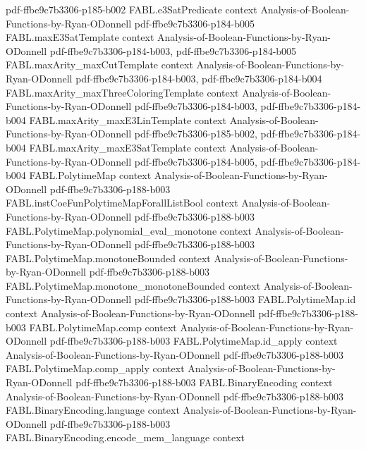 \begin{theorem}
{    pdf-ffbe9c7b3306-p185-b002}
\proofstep
  {FABL.e3SatPredicate}
  {context}
  {Analysis-of-Boolean-Functions-by-Ryan-ODonnell}
  {pdf-ffbe9c7b3306-p184-b005}
\proofstep
  {FABL.maxE3SatTemplate}
  {context}
  {Analysis-of-Boolean-Functions-by-Ryan-ODonnell}
  {pdf-ffbe9c7b3306-p184-b003,
    pdf-ffbe9c7b3306-p184-b005}
\proofstep
  {FABL.maxArity_maxCutTemplate}
  {context}
  {Analysis-of-Boolean-Functions-by-Ryan-ODonnell}
  {pdf-ffbe9c7b3306-p184-b003,
    pdf-ffbe9c7b3306-p184-b004}
\proofstep
  {FABL.maxArity_maxThreeColoringTemplate}
  {context}
  {Analysis-of-Boolean-Functions-by-Ryan-ODonnell}
  {pdf-ffbe9c7b3306-p184-b003,
    pdf-ffbe9c7b3306-p184-b004}
\proofstep
  {FABL.maxArity_maxE3LinTemplate}
  {context}
  {Analysis-of-Boolean-Functions-by-Ryan-ODonnell}
  {pdf-ffbe9c7b3306-p185-b002,
    pdf-ffbe9c7b3306-p184-b004}
\proofstep
  {FABL.maxArity_maxE3SatTemplate}
  {context}
  {Analysis-of-Boolean-Functions-by-Ryan-ODonnell}
  {pdf-ffbe9c7b3306-p184-b005,
    pdf-ffbe9c7b3306-p184-b004}
\proofstep
  {FABL.PolytimeMap}
  {context}
  {Analysis-of-Boolean-Functions-by-Ryan-ODonnell}
  {pdf-ffbe9c7b3306-p188-b003}
\proofstep
  {FABL.instCoeFunPolytimeMapForallListBool}
  {context}
  {Analysis-of-Boolean-Functions-by-Ryan-ODonnell}
  {pdf-ffbe9c7b3306-p188-b003}
\proofstep
  {FABL.PolytimeMap.polynomial_eval_monotone}
  {context}
  {Analysis-of-Boolean-Functions-by-Ryan-ODonnell}
  {pdf-ffbe9c7b3306-p188-b003}
\proofstep
  {FABL.PolytimeMap.monotoneBounded}
  {context}
  {Analysis-of-Boolean-Functions-by-Ryan-ODonnell}
  {pdf-ffbe9c7b3306-p188-b003}
\proofstep
  {FABL.PolytimeMap.monotone_monotoneBounded}
  {context}
  {Analysis-of-Boolean-Functions-by-Ryan-ODonnell}
  {pdf-ffbe9c7b3306-p188-b003}
\proofstep
  {FABL.PolytimeMap.id}
  {context}
  {Analysis-of-Boolean-Functions-by-Ryan-ODonnell}
  {pdf-ffbe9c7b3306-p188-b003}
\proofstep
  {FABL.PolytimeMap.comp}
  {context}
  {Analysis-of-Boolean-Functions-by-Ryan-ODonnell}
  {pdf-ffbe9c7b3306-p188-b003}
\proofstep
  {FABL.PolytimeMap.id_apply}
  {context}
  {Analysis-of-Boolean-Functions-by-Ryan-ODonnell}
  {pdf-ffbe9c7b3306-p188-b003}
\proofstep
  {FABL.PolytimeMap.comp_apply}
  {context}
  {Analysis-of-Boolean-Functions-by-Ryan-ODonnell}
  {pdf-ffbe9c7b3306-p188-b003}
\proofstep
  {FABL.BinaryEncoding}
  {context}
  {Analysis-of-Boolean-Functions-by-Ryan-ODonnell}
  {pdf-ffbe9c7b3306-p188-b003}
\proofstep
  {FABL.BinaryEncoding.language}
  {context}
  {Analysis-of-Boolean-Functions-by-Ryan-ODonnell}
  {pdf-ffbe9c7b3306-p188-b003}
\proofstep
  {FABL.BinaryEncoding.encode_mem_language}
  {context}

\end{theorem}
